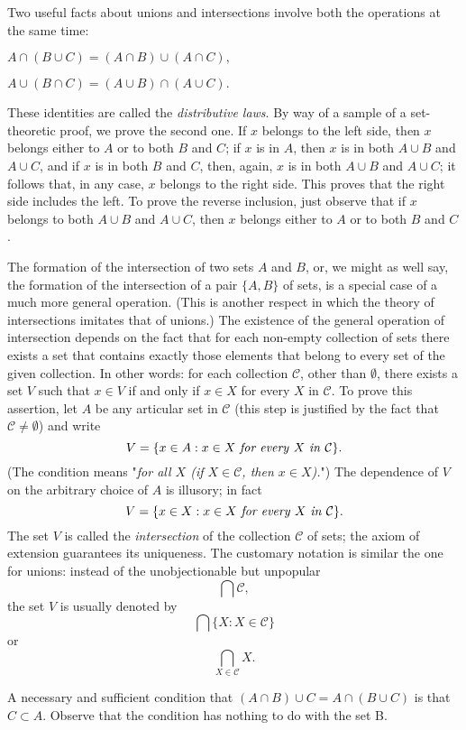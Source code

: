 Two useful facts about unions and intersections involve both the operations at the same time: 
\begin{center}
$A \cap (B \cup C) = (A \cap B) \cup (A \cap C),$

$A \cup (B \cap C) = (A \cup B) \cap (A \cup C).$
\end{center}
These identities are called the \textit{distributive laws}. By way of a sample of a set-theoretic proof, we prove the second one. If $x$ belongs to the left side, then $x$ belongs either to $A$ or to both $B$ and $C$; if $x$ is in $A$, then $x$ is in both $A \cup B$ and $A \cup C$, and if $x$ is in both $B$ and $C$, then, again, $x$ is in both $A \cup B$ and $A \cup C$; it follows that, in any case, $x$ belongs to the right side. This proves that the right side includes the left. To prove the reverse inclusion, just observe that if $x$ belongs to both $A \cup B$ and $A \cup C$, then $x$ belongs either to $A$ or to both $B$ and $C$. 

The formation of the intersection of two sets $A$ and $B$, or, we might as well say, the formation of the intersection of a pair $ \{ A, B \} $ of sets, is a special case of a much more general operation. (This is another respect in which the theory of intersections imitates that of unions.) The existence of the general operation of intersection depends on the fact that for each non-empty collection of sets there exists a set that contains exactly those elements that belong to every set of the given collection. In other words: for each collection $\mathcal{C}$, other than $ \emptyset $, there exists a set $V$ such that $x \in V$ if and only if $x \in X$ for every $X$ in $\mathcal{C}$. To prove this assertion, let $A$ be any articular set in $\mathcal{C}$ (this step is justified by the fact that $\mathcal{C} \neq \emptyset$) and write
\begin{equation*}
V = \{ x \in A: x \in X \text{ \textit{for every} } X \text{ \textit{in} } \mathcal{C} \}.
\end{equation*}
(The condition means "\textit{for all $X$ (if $X \in \mathcal{C}$, then $x \in X$).}") The dependence of $V$ on the arbitrary choice of $A$ is illusory; in fact
\begin{equation*}
V = \{ x \in X: x \in X \text{ \textit{for every} } X \text{ \textit{in} } \mathcal{C} \}.
\end{equation*}
The set $V$ is called the \textit{intersection} of the collection $ \mathcal{C} $ of sets; the axiom of extension guarantees its uniqueness. The customary notation is similar the one for unions: instead of the unobjectionable but unpopular
\begin{equation*}
\bigcap \mathcal{C} ,
\end{equation*}
the set $V$ is usually denoted by 
\begin{equation*}
\bigcap \{ X : X \in \mathcal{C} \}
\end{equation*}
or
\begin{equation*}
\bigcap_{X \in \mathcal{C}} X.
\end{equation*}

\begin{exercise} A necessary and sufficient condition that $(A \cap B) \cup C = A \cap (B \cup C)$ is that $C \subset A$. Observe that the condition has nothing to do with the set B.
\end{exercise}
